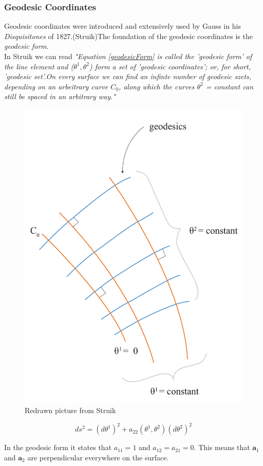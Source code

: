 \subsubsection{Geodesic Coordinates}

Geodesic coordinates were introduced and extensively used by Gauss in his \textit{Disquisitones} of 1827.(Struik)The foundation of the geodesic coordinates is the  \textit{geodesic form}.\\ 
In Struik we can read \textit{"Equation \ref{geodesicForm} is called the 'geodesic form' of the line element and ($\theta^1,\theta^2$) form a set of 'geodesic coordinates'; or, for short, 'geodesic set'.On every surface we can find an infinte number of geodesic szets, depending on an arbeitrary curve $C_0$, along which the curves $\theta^2$ = constant can still be spaced in an arbitrary way."}\\

\begin{figure}[H]
\centering
\includegraphics[height=0.8\linewidth ]{figure/Theory/geodesicCoordRe.pdf}
\caption{Redrawn picture from Struik }
\end{figure}


\begin{equation}\label{geodesicForm}
    ds^2 = (d\theta^1)^2 + a_{22}(\theta^1,\theta^2)(d\theta^2)^2
\end{equation}

In the geodesic form it states that $a_{11} = 1$ and $a_{12}=a_{21} = 0$. This means that $\textbf{a}_1$ and $\textbf{a}_2$ are perpendicular everywhere on the surface. 

